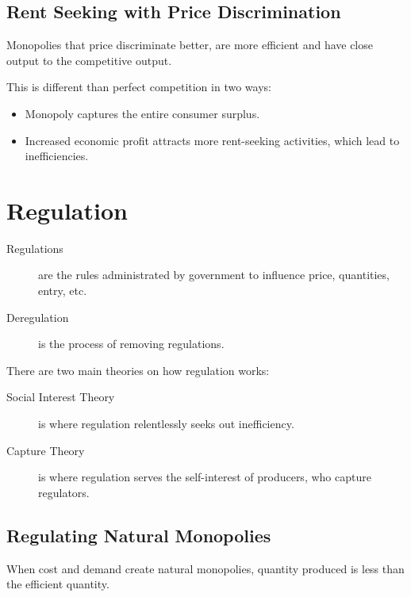                \subsection{Rent Seeking with Price Discrimination} %
                \label{sub:rent_seeking_with_price_discrimination}
                    Monopolies that price discriminate better, are more efficient and have close output to the competitive output.

                    This is different than perfect competition in two ways:
                    \begin{itemize}
                        \item Monopoly captures the entire consumer surplus.
                        \item Increased economic profit attracts more rent-seeking activities, which lead to inefficiencies.
                    \end{itemize}
            \section{Regulation} %
            \label{sec:regulation}
                \begin{description}
                    \item[Regulations] are the rules administrated by government to influence price, quantities, entry, etc.
                    \item[Deregulation] is the process of removing regulations.
                \end{description}

                There are two main theories on how regulation works:
                \begin{description}
                    \item[Social Interest Theory] is where regulation relentlessly seeks out inefficiency.
                    \item[Capture Theory] is where regulation serves the self-interest of producers, who capture regulators.
                \end{description}
                \subsection{Regulating Natural Monopolies} %
                \label{sub:regulating_natural_monopolies}
                    When cost and demand create natural monopolies, quantity produced is less than the efficient quantity.

